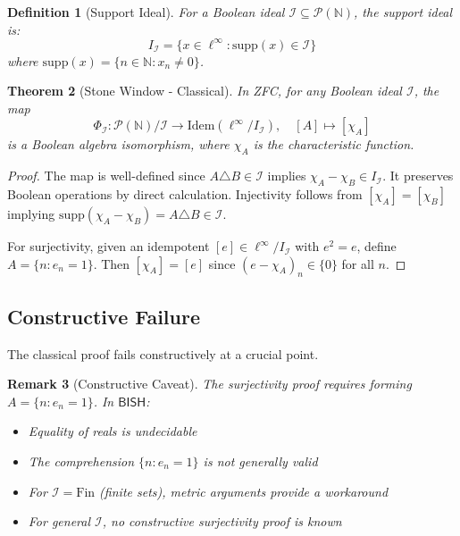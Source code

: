 \documentclass[11pt]{article}
\newtheorem{theorem}{Theorem}[section]
\newtheorem{definition}[theorem]{Definition}
\newtheorem{remark}[theorem]{Remark}
\newcommand{\N}{\mathbb{N}}
\newcommand{\BISH}{\mathsf{BISH}}
\newcommand{\linf}{\ell^\infty}
\begin{document}
\begin{definition}[Support Ideal]
For a Boolean ideal $\mathcal{I} \subseteq \mathcal{P}(\N)$, the \emph{support ideal} is:
\[
I_{\mathcal{I}} = \{x \in \linf : \text{supp}(x) \in \mathcal{I}\}
\]
where $\text{supp}(x) = \{n \in \N : x_n \neq 0\}$.
\end{definition}

\begin{theorem}[Stone Window - Classical]\label{thm:stone-classical}
In ZFC, for any Boolean ideal $\mathcal{I}$, the map
\[
\Phi_{\mathcal{I}}: \mathcal{P}(\N)/\mathcal{I} \to \text{Idem}(\linf/I_{\mathcal{I}}), \quad [A] \mapsto [\chi_A]
\]
is a Boolean algebra isomorphism, where $\chi_A$ is the characteristic function.
\end{theorem}

\begin{proof}
The map is well-defined since $A \triangle B \in \mathcal{I}$ implies $\chi_A - \chi_B \in I_{\mathcal{I}}$. It preserves Boolean operations by direct calculation. Injectivity follows from $[\chi_A] = [\chi_B]$ implying $\text{supp}(\chi_A - \chi_B) = A \triangle B \in \mathcal{I}$.

For surjectivity, given an idempotent $[e] \in \linf/I_{\mathcal{I}}$ with $e^2 = e$, define $A = \{n : e_n = 1\}$. Then $[\chi_A] = [e]$ since $(e - \chi_A)_n \in \{0\}$ for all $n$.
\end{proof}

\subsection{Constructive Failure}

The classical proof fails constructively at a crucial point.

\begin{remark}[Constructive Caveat]
The surjectivity proof requires forming $A = \{n : e_n = 1\}$. In $\BISH$:
\begin{itemize}
\item Equality of reals is undecidable
\item The comprehension $\{n : e_n = 1\}$ is not generally valid
\item For $\mathcal{I} = \text{Fin}$ (finite sets), metric arguments provide a workaround
\item For general $\mathcal{I}$, no constructive surjectivity proof is known
\end{itemize}
\end{remark}
\end{document}
